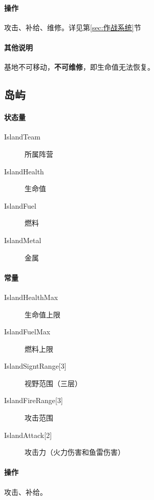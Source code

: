 \documentclass[11pt,a4paper]{article}
\begin{document}
      \paragraph{操作} 攻击、补给、维修。详见第\ref{sec:作战系统}节
      \paragraph{其他说明} 基地不可移动，\textbf{不可维修}，即生命值无法恢复。


    \subsection{岛屿}
      \paragraph{状态量}
        \begin{minipage}[t]{0.8\textwidth}
          \begin{description}
            \item[IslandTeam] 所属阵营
            \item[IslandHealth] 生命值
            \item[IslandFuel] 燃料
            \item[IslandMetal] 金属
          \end{description}
        \end{minipage}

      \paragraph{常量}
        \begin{minipage}[t]{0.8\textwidth}
          \begin{description}
            \item[IslandHealthMax] 生命值上限
            \item[IslandFuelMax] 燃料上限
            \item[{IslandSigntRange[3]}] 视野范围（三层）
            \item[{IslandFireRange[3]}] 攻击范围
            \item[{IslandAttack[2]}] 攻击力（火力伤害和鱼雷伤害）
          \end{description}
        \end{minipage}

      \paragraph{操作} 攻击、补给。
\end{document}
